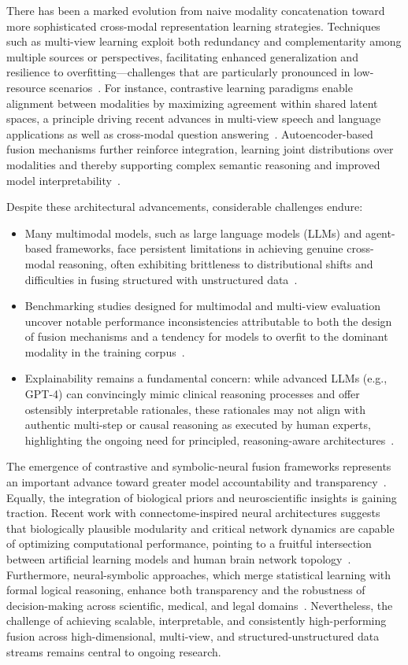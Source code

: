 \documentclass[11pt]{article}
\begin{document}
There has been a marked evolution from naive modality concatenation toward more sophisticated cross-modal representation learning strategies. Techniques such as multi-view learning exploit both redundancy and complementarity among multiple sources or perspectives, facilitating enhanced generalization and resilience to overfitting—challenges that are particularly pronounced in low-resource scenarios~\cite{79}. For instance, contrastive learning paradigms enable alignment between modalities by maximizing agreement within shared latent spaces, a principle driving recent advances in multi-view speech and language applications as well as cross-modal question answering~\cite{31,79}. Autoencoder-based fusion mechanisms further reinforce integration, learning joint distributions over modalities and thereby supporting complex semantic reasoning and improved model interpretability~\cite{79,46,47}. 

Despite these architectural advancements, considerable challenges endure:
\begin{itemize}
    \item Many multimodal models, such as large language models (LLMs) and agent-based frameworks, face persistent limitations in achieving genuine cross-modal reasoning, often exhibiting brittleness to distributional shifts and difficulties in fusing structured with unstructured data~\cite{36,46,49,60,74,90}.
    \item Benchmarking studies designed for multimodal and multi-view evaluation uncover notable performance inconsistencies attributable to both the design of fusion mechanisms and a tendency for models to overfit to the dominant modality in the training corpus~\cite{31,74,80,87,88}.
    \item Explainability remains a fundamental concern: while advanced LLMs (e.g., GPT-4) can convincingly mimic clinical reasoning processes and offer ostensibly interpretable rationales, these rationales may not align with authentic multi-step or causal reasoning as executed by human experts, highlighting the ongoing need for principled, reasoning-aware architectures~\cite{31,36,49,55,89}.
\end{itemize}

The emergence of contrastive and symbolic-neural fusion frameworks represents an important advance toward greater model accountability and transparency~\cite{46,47,48,50,88}. Equally, the integration of biological priors and neuroscientific insights is gaining traction. Recent work with connectome-inspired neural architectures suggests that biologically plausible modularity and critical network dynamics are capable of optimizing computational performance, pointing to a fruitful intersection between artificial learning models and human brain network topology~\cite{90}. Furthermore, neural-symbolic approaches, which merge statistical learning with formal logical reasoning, enhance both transparency and the robustness of decision-making across scientific, medical, and legal domains~\cite{46,47,48,49,50}. Nevertheless, the challenge of achieving scalable, interpretable, and consistently high-performing fusion across high-dimensional, multi-view, and structured-unstructured data streams remains central to ongoing research.
\end{document}
